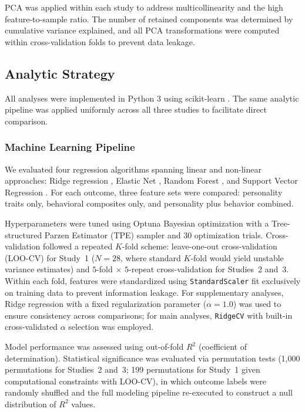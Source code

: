 \documentclass[12pt, a4paper]{article}
\begin{document}
PCA was applied within each study to address multicollinearity and the high feature-to-sample ratio. The number of retained components was determined by cumulative variance explained, and all PCA transformations were computed within cross-validation folds to prevent data leakage.

\subsection{Analytic Strategy}

All analyses were implemented in Python 3 using scikit-learn \citep{pedregosa2011scikit}. The same analytic pipeline was applied uniformly across all three studies to facilitate direct comparison.

\subsubsection{Machine Learning Pipeline}

We evaluated four regression algorithms spanning linear and non-linear approaches: Ridge regression \citep{hoerl1970ridge}, Elastic Net \citep{zou2005regularization}, Random Forest \citep{breiman2001random}, and Support Vector Regression \citep[SVR;][]{drucker1997svr}. For each outcome, three feature sets were compared: personality traits only, behavioral composites only, and personality plus behavior combined.

Hyperparameters were tuned using Optuna Bayesian optimization \citep{akiba2019optuna} with a Tree-structured Parzen Estimator (TPE) sampler and 30 optimization trials. Cross-validation followed a repeated $K$-fold scheme: leave-one-out cross-validation (LOO-CV) for Study~1 ($N = 28$, where standard $K$-fold would yield unstable variance estimates) and $5$-fold $\times$ $5$-repeat cross-validation for Studies~2 and~3. Within each fold, features were standardized using \texttt{StandardScaler} fit exclusively on training data to prevent information leakage. For supplementary analyses, Ridge regression with a fixed regularization parameter ($\alpha = 1.0$) was used to ensure consistency across comparisons; for main analyses, \texttt{RidgeCV} with built-in cross-validated $\alpha$ selection was employed.

Model performance was assessed using out-of-fold $R^2$ (coefficient of determination). Statistical significance was evaluated via permutation tests (1,000 permutations for Studies~2 and~3; 199 permutations for Study~1 given computational constraints with LOO-CV), in which outcome labels were randomly shuffled and the full modeling pipeline re-executed to construct a null distribution of $R^2$ values.
\end{document}
